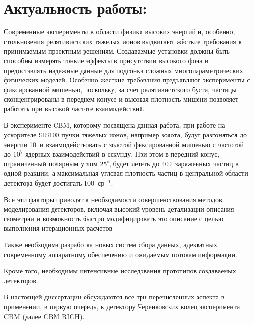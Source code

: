 \section*{Актуальность работы:}

Современные эксперименты в области физики высоких энергий и, особенно, столкновения релятивистских тяжелых ионов выдвигают жёсткие требования к принимаемым проектным решениям. Создаваемые установки должны быть способны измерять тонкие эффекты в присутствии высокого фона и предоставлять надежные данные для подгонки сложных многопараметрических физических моделей. Особенно жесткие требования предъявляют эксперименты с фиксированной мишенью, поскольку, за счет релятивистского буста, частицы сконцентрированы в переднем конусе и высокая плотность мишени позволяет работать при высокой частоте взаимодействий.

В эксперименте CBM, которому посвящена данная работа, при работе на ускорителе SIS100 пучки тяжелых ионов, например золота, будут разгоняться до энергии 10~\GeVperNucl и взаимодействовать с золотой фиксированной мишенью с частотой до $10^7$ ядерных взаимодействий в секунду. При этом в передний конус, ограниченный полярным углом $25^\circ$, будет лететь до 400~заряженных частиц в одной реакции, а максимальная угловая плотность частиц в центральной области детектора будет достигать 100~ср$^{-1}$.

\todo 
Все эти факторы приводят к необходимости совершенствования методов моделирования детекторов, включая высокий уровень детализации описания геометрии и возможность быстро модифицировать это описание с целью выполнения итерационных расчетов.
\todo 

Также необходима разработка новых систем сбора данных, адекватных современному аппаратному обеспечению и ожидаемым потокам информации.

Кроме того, необходимы интенсивные исследования прототипов создаваемых детекторов.

В настоящей диссертации обсуждаются все три перечисленных аспекта в применении, в первую очередь, к детектору Черенковских колец эксперимента CBM (далее CBM RICH).